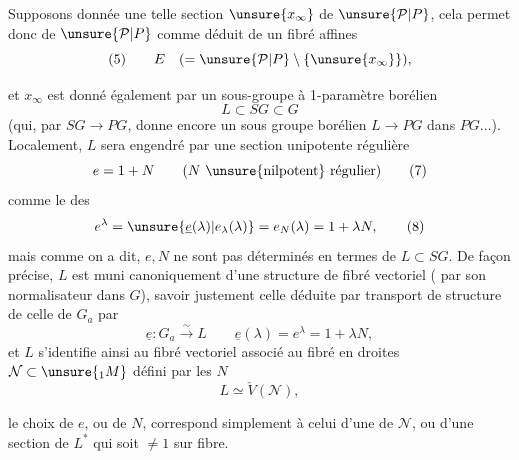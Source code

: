 Supposons donnée une telle section $\unsure{x_\infty}$ de $\unsure{\mathcal P|P}$, cela permet donc de   $\unsure{\mathcal P|P}$ comme déduit de un fibré  affines
\[
(5)\qquad E\quad(=\unsure{\mathcal P|P}\setminus\{\unsure{x_\infty}\}),
\]



et $x_\infty$ est donné également par un sous-groupe à 1-paramètre borélien
\[
L\subset SG\subset G \tag{6}
\]
(qui, par $SG\longrightarrow PG$, donne encore un sous groupe  borélien $L\longrightarrow PG$ dans $PG\ldots$). Localement, $L$ sera engendré par une section unipotente régulière
\[
e=1+N\qquad (N\text{ \unsure{nilpotent} régulier}) \tag{7}
\]
comme le  des
\[
e^\lambda=\unsure{\underline e(\lambda)|e_{\lambda}(\lambda)}=e_N(\lambda)=1+\lambda N, \tag{8}
\]
mais comme on a dit, $e,N$ ne sont pas déterminés  en termes de $L\subset SG$. De façon précise, $L$ est muni canoniquement d'une structure de fibré vectoriel ( par son normalisateur dans $G$),   savoir justement celle déduite par transport de structure de celle de $G_a$ par
\[
\underline e:G_a\xrightarrow{\sim}L\qquad
\underline e(\lambda)=e^\lambda=1+\lambda N,
\]
et  $L$ s'identifie ainsi au fibré vectoriel  associé au fibré en droites $\mathcal N\subset\unsure{{}_1M}$  défini par les $N$
\[
L\simeq\check V(\mathcal N), \tag{9}
\]


le choix de $e$, ou de $N$, correspond simplement à celui d'une   de $\mathcal N$, ou d'une section de $L^*$   qui soit $\ne1$ sur  fibre.


